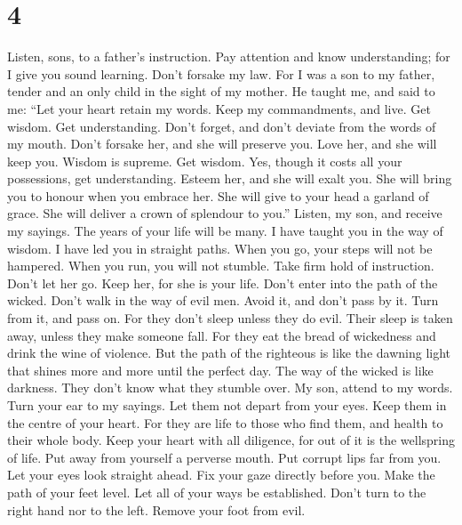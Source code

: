 \hypertarget{section-3}{%
\section{4}\label{section-3}}

 Listen, sons, to a father's instruction. Pay attention and
know understanding;  for I give you sound learning. Don't
forsake my law.  For I was a son to my father, tender and an
only child in the sight of my mother.  He taught me, and
said to me: ``Let your heart retain my words. Keep my commandments, and
live.  Get wisdom. Get understanding. Don't forget, and
don't deviate from the words of my mouth.  Don't forsake
her, and she will preserve you. Love her, and she will keep you.
 Wisdom is supreme. Get wisdom. Yes, though it costs all
your possessions, get understanding.  Esteem her, and she
will exalt you. She will bring you to honour when you embrace her.
 She will give to your head a garland of grace. She will
deliver a crown of splendour to you.''  Listen, my son, and
receive my sayings. The years of your life will be many.  I
have taught you in the way of wisdom. I have led you in straight paths.
 When you go, your steps will not be hampered. When you
run, you will not stumble.  Take firm hold of instruction.
Don't let her go. Keep her, for she is your life.  Don't
enter into the path of the wicked. Don't walk in the way of evil men.
 Avoid it, and don't pass by it. Turn from it, and pass on.
 For they don't sleep unless they do evil. Their sleep is
taken away, unless they make someone fall.  For they eat
the bread of wickedness and drink the wine of violence. 
But the path of the righteous is like the dawning light that shines more
and more until the perfect day.  The way of the wicked is
like darkness. They don't know what they stumble over.  My
son, attend to my words. Turn your ear to my sayings.  Let
them not depart from your eyes. Keep them in the centre of your heart.
 For they are life to those who find them, and health to
their whole body.  Keep your heart with all diligence, for
out of it is the wellspring of life.  Put away from
yourself a perverse mouth. Put corrupt lips far from you. 
Let your eyes look straight ahead. Fix your gaze directly before you.
 Make the path of your feet level. Let all of your ways be
established.  Don't turn to the right hand nor to the left.
Remove your foot from evil.

